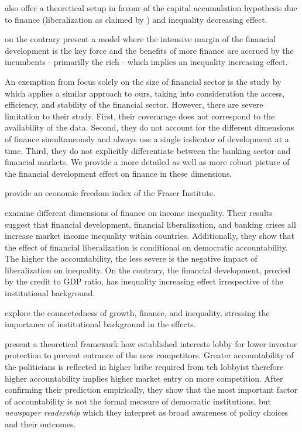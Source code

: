 \documentclass[a4paper,11pt]{article}
\begin{document}
\citet{banerjeenewman1990} also offer a theoretical setup in favour of the capital accumulation hypothesis due to finance (liberalization as claimed by \citet{de2017finance}) and inequality decreasing effect.

\citet{GreenwoodJovanovic1990} on the contrary present a model where the intensive margin of the financial development is the key force and the benefits of more finance are accrued by the incumbents - primarilly the rich - which implies an inequality increasing effect.

An exemption from focus solely on the size of financial sector is the study by \citet{naceurzhang2016} which applies a similar approach to ours, taking into consideration the access, efficiency, and stability of the financial sector. However, there are severe limitation to their study. First, their coverarage does not correspond to the availability of the data. Second, they do not account for the different dimensions of finance simultaneously and always use a single indicator of development at a time. Third, they do not explicitly differentiate between the banking sector and financial markets. We provide a more detailed as well as more robust picture of the financial development effect on finance in these dimensions.

\citet{gwartney2017} provide an economic freedom index of the Fraser Institute.

\citet{de2017finance} examine different dimensions of finance on income inequality. Their results suggest that financial development, financial liberalization, and banking crises all increase market income inequality within countries. Additionally, they show that the effect of financial liberalization is conditional on democratic accountability. The higher the accountability, the less severe is the negative impact of liberalization on inequality. On the contrary, the financial development, proxied by the credit to GDP ratio, has inequality increasing effect irrespective of the institutional background.

\citet{claessens2007finance} explore the connectedness of growth, finance, and inequality, stressing the importance of institutional background in the effects.  

\citet{perotti2007investor} present a theoretical framework how established interests lobby for lower investor protection to prevent entrance of the new competitors. Greater accountability of the politicians is reflected in higher bribe required from teh lobbyist therefore higher accountability implies higher market entry on more competition. After confirming their prediction empirically, they show that the most important factor of accountability is not the formal measure of democratic institutions, but \emph{newspaper readership} which they interpret as broad awareness of policy choices and their outcomes.
\end{document}
